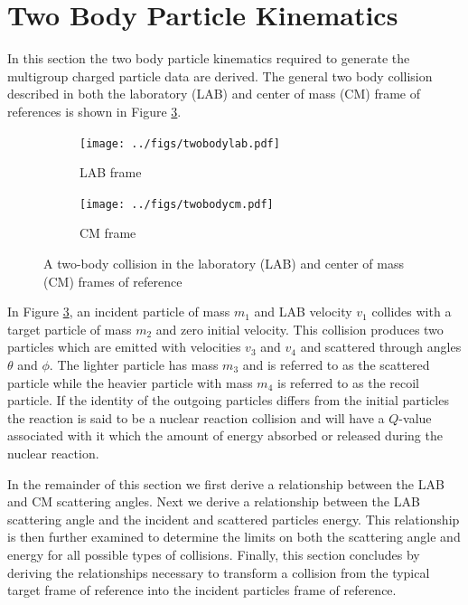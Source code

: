 \section{Two Body Particle Kinematics}
In this section the two body particle kinematics required to generate the multigroup charged particle data are derived. The general two body collision described in both the laboratory (LAB) and center of mass (CM) frame of references is shown in Figure \ref{fig:two-body-figure}. 
\begin{figure}[!htb]
  \centering
  \begin{subfigure}{.45\textwidth}
    \centering
    \texttt{[image: ../figs/twobodylab.pdf]}
    \caption{LAB frame}
    \label{fig:lab-fom}
  \end{subfigure}%
  \begin{subfigure}{.45\textwidth}
    \centering
    \texttt{[image: ../figs/twobodycm.pdf]}
    \caption{CM frame}
    \label{fig:cm-fom}
  \end{subfigure}
  \caption{A two-body collision in the laboratory (LAB) and center of mass (CM) frames of reference}
  \label{fig:two-body-figure}
\end{figure}
In Figure \ref{fig:two-body-figure}, an incident particle of mass $m_1$ and LAB velocity $v_1$ collides with a target particle of mass $m_2$ and zero initial velocity. This collision produces two particles which are emitted with velocities $v_3$ and $v_4$ and scattered through angles $\theta$ and $\phi$. The lighter particle has mass $m_3$ and is referred to as the scattered particle while the heavier particle with mass $m_4$ is referred to as the recoil particle. If the identity of the outgoing particles differs from the initial particles the reaction is said to be a nuclear reaction collision and will have a $Q$-value associated with it which the amount of energy absorbed or released during the nuclear reaction.

In the remainder of this section we first derive a relationship between the LAB and CM scattering angles. Next we derive a relationship between the LAB scattering angle and the incident and scattered particles energy. This relationship is then further examined to determine the limits on both the scattering angle and energy for all possible types of collisions. Finally, this section concludes by deriving the relationships necessary to transform a collision from the typical target frame of reference into the incident particles frame of reference.

